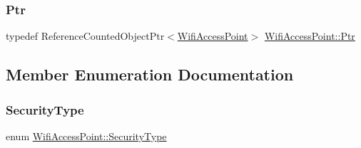 \subsubsection{\texorpdfstring{Ptr}{Ptr}}
{\footnotesize\ttfamily typedef Reference\+Counted\+Object\+Ptr$<$\mbox{\hyperlink{classWifiAccessPoint}{Wifi\+Access\+Point}}$>$ \mbox{\hyperlink{classWifiAccessPoint_ad18977f884076774803027efbaa131a0}{Wifi\+Access\+Point\+::\+Ptr}}}



\subsection{Member Enumeration Documentation}
\mbox{\label{classWifiAccessPoint_aaad51b8e8ee5297faa66386c597fae92}} 
\subsubsection{\texorpdfstring{Security\+Type}{SecurityType}}
{\footnotesize\ttfamily enum \mbox{\hyperlink{classWifiAccessPoint_aaad51b8e8ee5297faa66386c597fae92}{Wifi\+Access\+Point\+::\+Security\+Type}}}

